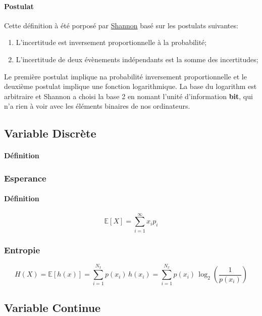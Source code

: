 \documentclass{article}
\begin{document}
\paragraph{Postulat}Cette définition à été porposé par \href{https://fr.wikipedia.org/wiki/Claude_Shannon}{Shannon} basé sur les postulats suivantes:
\begin{enumerate}
    \item L'incertitude est inversement proportionnelle à la probabilité;
    \item L'incertitude de deux évènements indépendants est la somme des incertitudes;
\end{enumerate}
Le première postulat implique na probabilité inversement proportionnelle et le deuxième postulat implique une fonction logarithmique. La base du logarithm est arbitraire et Shannon a choisi la base 2 en nomant l'unité d'information \textbf{bit}, qui n'a rien à voir avec les éléments binaires de nos ordinateurs.


\subsection{Variable Discrète}
\paragraph{Définition}

\subsubsection{Esperance}
\paragraph{Définition}
\begin{equation}\label{eq:esperance_discrete}
    \boxed{
        \mathbb{E}[X] = \sum_{i=1}^{\infty} x_i p_i
    }
\end{equation}

\subsubsection{Entropie}
\begin{equation}
    \boxed{
        H(X) = \mathbb{E}[h(x)] = 
        \sum_{i=1}^{N_x} p(x_i)\,h(x_i) = 
        \sum_{i=1}^{N_x} p(x_i)\,\log_{2}\left(\frac{1}{p(x_i)}\right)
    }
\end{equation}

\subsection{Variable Continue}
\end{document}
